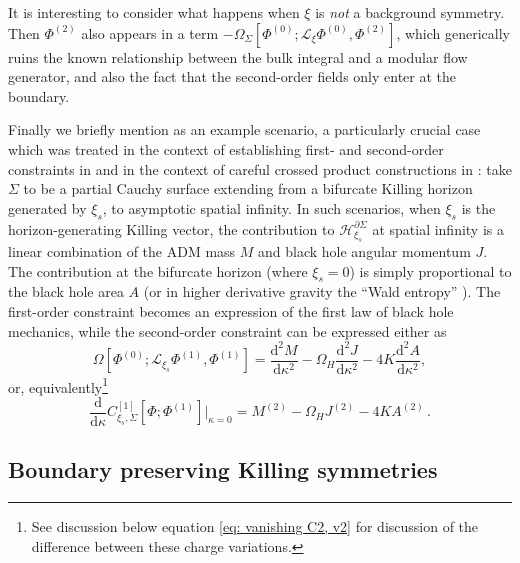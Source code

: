 \documentclass[]{jkpaper}
\theoremstyle{plain}
\theoremstyle{definition}
\newcommand{\sd}{\mathrm {d}}
\newcommand{\sL}{\mathcal{L}}
\begin{document}
It is interesting to consider what happens when $\xi$ is \textit{not} a background symmetry. Then $\Phi^{(2)}$ also appears in a term $-\Omega_\Sigma\left[\Phi^{(0)};\sL_\xi\Phi^{(0)},\Phi^{(2)}\right]$, which generically ruins the known relationship between the bulk integral and a modular flow generator, and also the fact that the second-order fields only enter at the boundary.

Finally we briefly mention as an example scenario, a particularly crucial case which was treated in the context of establishing first- and second-order constraints in \cite{Hollands:2012sf} and in the context of careful crossed product constructions in \cite{Kudler-Flam:2023qfl}: take $\Sigma$ to be a partial Cauchy surface extending from a bifurcate Killing horizon generated by $\xi_s$, to asymptotic spatial infinity.  In such scenarios, when $\xi_s$ is the horizon-generating Killing vector, the contribution to $\mathcal{H}^{\partial\Sigma}_{\xi_s}$ at spatial infinity is a linear combination of the ADM mass $M$ and black hole  angular momentum $J$.  The contribution at the bifurcate horizon (where $\xi_s=0$) is simply proportional to the black hole area $A$ (or in higher derivative gravity the ``Wald entropy'' \cite{Wald:1993nt}).  The first-order constraint becomes an expression of the first law of black hole mechanics, while the second-order constraint can be expressed either as
\begin{equation}\label{eq: BH first law second order 1}
    \Omega[\Phi^{(0)}; \sL_{\xi_s}\Phi^{(1)},\Phi^{(1)}]
    =\frac{\sd^2 M}{\sd\kappa^2}-\Omega_H\frac{\sd^2 J}{\sd\kappa^2} - 4 K \frac{\sd^2 A}{\sd\kappa^2},
\end{equation}
or, equivalently\footnote{See discussion below equation \eqref{eq: vanishing C2, v2} for discussion of the difference between these charge variations.}
\begin{equation}\label{eq: BH first law second order 2}
    \frac{\sd}{\sd\kappa}C^{[1]}_{\xi_s,\Sigma}\left[\Phi;\Phi^{(1)}\right]\big|_{\kappa=0}
    =M^{(2)}-\Omega_H J^{(2)} - 4 K A^{(2)}\,.
\end{equation}


\subsection{Boundary preserving Killing symmetries}
\label{sec: boundrary preserving}
\end{document}
